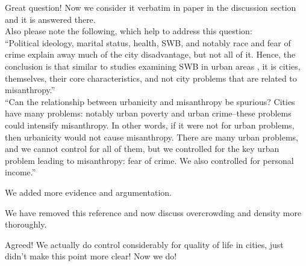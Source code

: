 Great question! Now we consider it verbatim in paper in the discussion section
and it is
answered there.\\

Also please note  the following, which help to address this question:\\

``Political ideology, marital status, health, SWB, and notably race and fear of crime explain away much of the city disadvantage, but not all of it. Hence, the
conclusion is that similar to studies examining SWB in urban areas \citep{aok_brfss_city_cize16}, it is cities, themselves, their core characteristics, and not city problems that are related to misanthropy.''\\

``Can the relationship between urbanicity and misanthropy be spurious? Cities have many problems: notably urban poverty and urban crime--these problems could intensify misanthropy. In other words, if it were not for urban problems, then urbanicity would not cause misanthropy. There are many urban problems, and we cannot control for all of them, but we controlled for the key urban problem leading to misanthropy: fear of crime. We also controlled for personal income.''


We added more evidence and argumentation. 


We have removed this reference and now discuss overcrowding and density more thoroughly. 



Agreed! We actually do control considerably for quality of life in cities, just didn't make this point more clear! Now we do!



